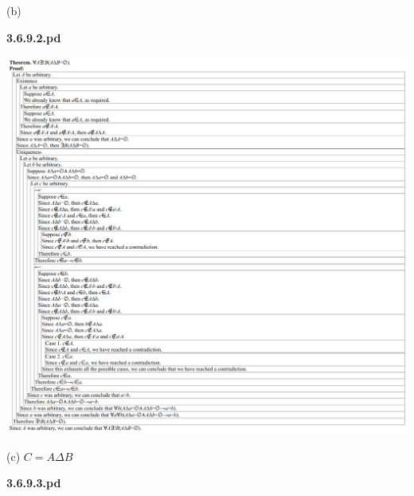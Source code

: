 \documentclass{article}
\begin{document}
\vspace{30pt}

(b)

\textbf{3.6.9.2.pd}
\vspace{10pt}

\includegraphics[width=\textwidth,height=\textheight,keepaspectratio]{3_6_9_2}

\vspace{30pt}

(c) $C = A \Delta B$

\textbf{3.6.9.3.pd}
\vspace{10pt}
\end{document}
